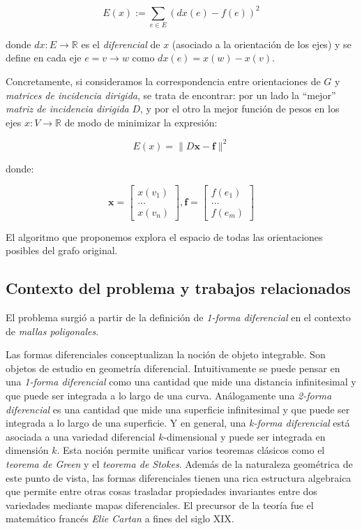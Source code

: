 \documentclass[conference,compsoc,a4paper]{IEEEtran}
\begin{document}
$$E(x) := \sum_{e \in E} (dx(e) - f(e))^2$$

\noindent donde $dx: E \rightarrow \mathbb{R}$ es el \textit{diferencial} de $x$ 
(asociado a la orientación de los ejes) y se define en cada eje 
$e=v\to w$ como $dx(e) = x(w) - x(v)$.

\smallskip

Concretamente, si consideramos la correspondencia entre orientaciones 
de $G$ y \textit{matrices de incidencia dirigida}, se trata de 
encontrar: por un lado la ``mejor'' \textit{matriz de incidencia 
dirigida} $D$, y por el otro la mejor función de pesos en los ejes 
$x: V \rightarrow \mathbb{R}$ de modo de minimizar la expresión:

$$E(x) = \|D\bm{x}-\bm{f}\|^2$$

\noindent donde:

$$
\bm{x} = 
\begin{bmatrix}
	x(v_1)\\
	\dots \\
	x(v_n)
\end{bmatrix}, 
\bm{f} = 
\begin{bmatrix}
	f(e_1)\\
	\dots \\
	f(e_m)
\end{bmatrix}
$$

El algoritmo que proponemos explora el espacio de todas las 
orientaciones posibles del grafo original.

\subsection{Contexto del problema y trabajos relacionados}
El problema surgió a partir de la definición de \textit{1-forma 
diferencial} en el contexto de \textit{mallas poligonales}. 

\bigskip

Las formas diferenciales \cite{S:1965,T:2008} conceptualizan la noción 
de objeto integrable. Son objetos de estudio en geometría diferencial. 
Intuitivamente se puede pensar en una 
\textit{1-forma diferencial} como una cantidad que mide 
una distancia infinitesimal y que puede ser integrada a lo largo de una 
curva. Análogamente una \textit{2-forma diferencial} es una cantidad 
que mide una superficie infinitesimal y que puede ser integrada a lo 
largo de una superficie. Y en general, una \textit{k-forma diferencial} 
está asociada a una variedad diferencial $k$-dimensional y puede ser 
integrada en dimensión $k$. Esta noción permite unificar varios 
teoremas clásicos como el \textit{teorema de Green} y el \textit{teorema 
de Stokes}. Además de la naturaleza geométrica de este punto de vista, 
las formas diferenciales tienen una rica estructura algebraica que 
permite entre otras cosas trasladar propiedades invariantes entre dos 
variedades mediante mapas diferenciales. El precursor de la 
teoría fue el matemático francés \textit{Elie Cartan} a fines del siglo 
XIX.
\end{document}
